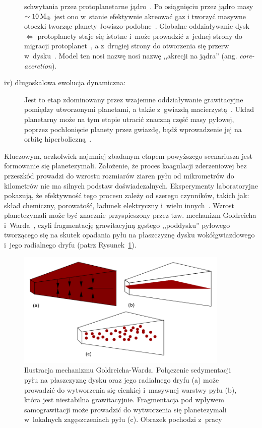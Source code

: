\begin{description}
   schwytania przez protoplanetarne jądro~\cite{II03}. Po osiągnięciu przez
   jądro masy $\sim 10\hbox{$\mathrm{\thinspace M_{\oplus}}$}$ jest ono w~stanie efektywnie akreować gaz i
   tworzyć masywne otoczki tworząc planety Jowiszo-podobne~\cite{Petal96}.
   Globalne oddziaływanie dysk $\iff$ protoplanety staje się istotne i~może
   prowadzić z~jednej strony do migracji protoplanet~\cite{Papa07}, a z~drugiej
   strony do otworzenia się przerw w~dysku~\citep{KKI06}. Model ten nosi nazwę
   nosi nazwę ,,akrecji na jądra'' (ang. \emph{core-accretion}). 
%
\item[iv) długoskalowa ewolucja dynamiczna:]
   Jest to etap zdominowany przez wzajemne oddziaływanie
   grawitacyjne pomiędzy utworzonymi planetami, a także z~gwiazdą
   macierzystą~\cite{CW98}.  Układ planetarny może na tym etapie utracić znaczną
   część masy pyłowej, poprzez pochłonięcie planety przez gwiazdę, bądź
   wprowadzenie jej na orbitę hiperboliczną~\cite{DAA13}.
%
\end{description}
Kluczowym, aczkolwiek najmniej zbadanym etapem powyższego scenariusza jest
formowanie się planetezymali. Założenie, że proces koagulacji zderzeniowej bez
przeszkód prowadzi do wzrostu rozmiarów ziaren pyłu od mikrometrów do kilometrów
nie ma silnych podstaw doświadczalnych. Eksperymenty laboratoryjne pokazują, że
efektywność tego procesu zależy od szeregu czynników, takich jak: skład
chemiczny, porowatość, ładunek elektryczny i~wielu innych~\cite{SBT97, GBZ10}.
Wzrost planetezymali może być znacznie przyspieszony przez tzw. mechanizm
Goldreicha i~Warda~\cite{GW73}, czyli fragmentację grawitacyjną gęstego
,,poddysku'' pyłowego tworzącego się na skutek opadania pyłu na płaszczyznę
dysku wokółgwiazdowego i~jego radialnego dryfu (patrz Rysunek~\ref{fig:GW}).

\begin{figure}[h]
   \centering
   \includegraphics[width=0.9\textwidth]{figures/sedymentacja.png}
   \caption{Ilustracja mechanizmu Goldreicha-Warda. Połączenie sedymentacji pyłu
      na płaszczyznę dysku oraz jego radialnego dryfu (a) może prowadzić do
      wytworzenia się cienkiej i~masywnej warstwy pyłu (b), która jest
      niestabilna grawitacyjnie. Fragmentacja pod wpływem samograwitacji może
      prowadzić do wytworzenia się planetezymali w~lokalnych zagęszczeniach pyłu
      (c). Obrazek pochodzi z~pracy~\cite{armitage}
   }
   \label{fig:GW}
\end{figure}

